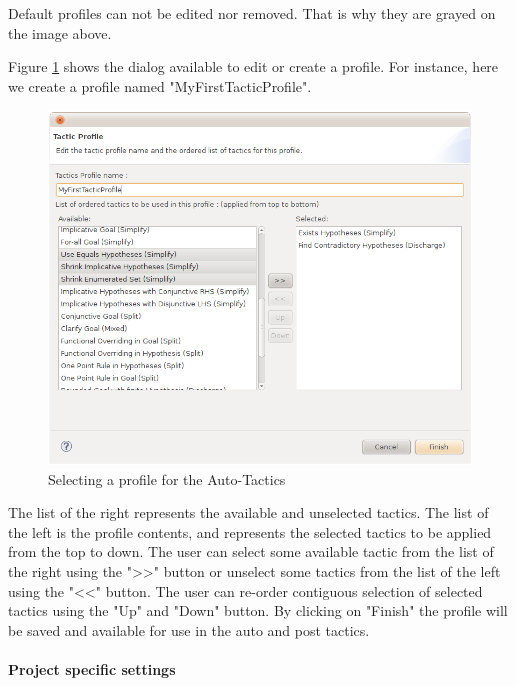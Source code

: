 Default profiles can not be edited nor removed. That is why they are grayed on the image above.

Figure \ref{fig_ref_01_preferences10} shows the dialog available to edit or create a profile. For instance, here we create a profile named "MyFirstTacticProfile".

\begin{figure}[!h]
\begin{center}
	\includegraphics{img/reference/ref_01_preferences10.png}
	\caption{Selecting a profile for the Auto-Tactics}
	\label{fig_ref_01_preferences10}
\end{center}
\end{figure}

The list of the right represents the available and unselected tactics. The list of the left is the profile contents, and represents the selected tactics to be applied from the top to down. The user can select some available tactic from the list of the right using the ">>" button or unselect some tactics from the list of the left using the "<<" button. The user can re-order contiguous selection of selected tactics using the "Up" and "Down" button. By clicking on "Finish" the profile will be saved and available for use in the auto and post tactics.

\paragraph{Project specific settings}

